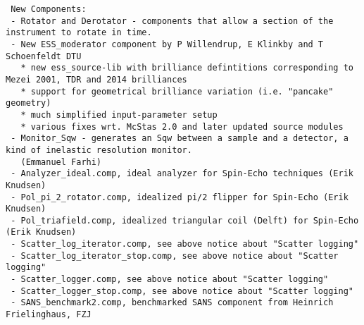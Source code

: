 \begin{lstlisting}
 New Components:
 - Rotator and Derotator - components that allow a section of the instrument to rotate in time.
 - New ESS_moderator component by P Willendrup, E Klinkby and T Schoenfeldt DTU
   * new ess_source-lib with brilliance defintitions corresponding to Mezei 2001, TDR and 2014 brilliances
   * support for geometrical brilliance variation (i.e. "pancake" geometry)
   * much simplified input-parameter setup
   * various fixes wrt. McStas 2.0 and later updated source modules
 - Monitor_Sqw - generates an Sqw between a sample and a detector, a kind of inelastic resolution monitor.
   (Emmanuel Farhi)
 - Analyzer_ideal.comp, ideal analyzer for Spin-Echo techniques (Erik Knudsen)
 - Pol_pi_2_rotator.comp, idealized pi/2 flipper for Spin-Echo (Erik Knudsen)
 - Pol_triafield.comp, idealized triangular coil (Delft) for Spin-Echo (Erik Knudsen)
 - Scatter_log_iterator.comp, see above notice about "Scatter logging"
 - Scatter_log_iterator_stop.comp, see above notice about "Scatter logging"
 - Scatter_logger.comp, see above notice about "Scatter logging"
 - Scatter_logger_stop.comp, see above notice about "Scatter logging"
 - SANS_benchmark2.comp, benchmarked SANS component from Heinrich Frielinghaus, FZJ


\end{lstlisting}
